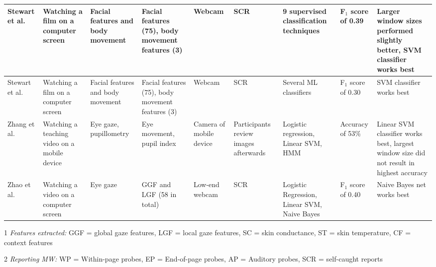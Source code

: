 \begin{xtabular}{p{25mm}p{30mm}p{30mm}p{22mm}p{38mm}p{22mm}p{33mm}p{22mm}p{35mm}}
Stewart et al. \cite{Stewart2017FaceComprehension} & Watching a film on a computer screen & Facial features and body movement & Facial features (75), body movement features (3) & Webcam & SCR & 9 supervised classification techniques & F$_1$ score of 0.39 & Larger window sizes performed slightly better, SVM classifier works best\\ \midrule
Stewart et al. \cite{Stewart2016WheresViewing} & Watching a film on a computer screen & Facial features and body movement & Facial features (75), body movement features (3) & Webcam & SCR & Several ML classifiers & F$_1$ score of 0.30 & SVM classifier works best\\ \midrule
Zhang et al. \cite{ISI:000443429900018} & Watching a teaching video on a mobile device & Eye gaze, pupillometry & Eye movement, pupil index & Camera of mobile device & Participants review images afterwards & Logistic regression, Linear SVM, HMM & Accuracy of 53\% & Linear SVM classifier works best, largest window size did not result in highest accuracy\\ \midrule
Zhao et al. \cite{Zhao2017ScalableApproach} & Watching a video on a computer screen & Eye gaze & GGF and LGF (58 in total) & Low-end webcam & SCR & Logistic Regression, Linear SVM, Naive Bayes & F$_1$ score of 0.40 & Naive Bayes net works best\\ \midrule
\bottomrule
\end{xtabular}
\begin{ThreePartTable}
        \begin{tablenotes}
        \small
        \item[1] \emph{Features extracted:} GGF = global gaze features, LGF = local gaze features, SC = skin conductance, ST = skin temperature, CF = context features
        \item[2] \emph{Reporting MW:} WP = Within-page probes, EP = End-of-page probes, AP = Auditory probes, SCR = self-caught reports
        \end{tablenotes}
\end{ThreePartTable}
\restoregeometry %
\twocolumn       %